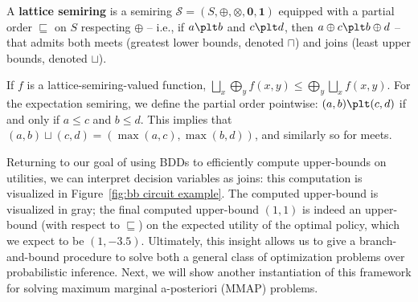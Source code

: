 \begin{definition}\label{def:latticed semiring}
  A \textbf{lattice semiring} is a semiring $\mathcal S = (S, \oplus, \otimes,
  \mathbf{0}, \mathbf{1})$ equipped with a partial order $\sqsubseteq$ on
  $S$ respecting $\oplus$ -- i.e., if $a \plt b$ and $c \plt d$, then
  $a \oplus c \plt b \oplus d$ -- that admits both meets (greatest lower bounds,
  denoted $\sqcap$) and joins (least upper bounds, denoted $\sqcup$).
\end{definition}

If $f$ is a lattice-semiring-valued function, $\bigsqcup_x \bigoplus_y
 f(x,y) \le  \bigoplus_y \bigsqcup_x f(x,y)$.  For the expectation
semiring, we define the partial order pointwise: $(a, b) \plt (c, d)$ if and
only if $a \le c$ and $b \le d$. This implies that $(a, b) \sqcup (c, d) =
(\max(a, c), \max(b, d))$, and similarly so for meets.

Returning to our goal of using BDDs to efficiently compute upper-bounds on
utilities, we can interpret decision variables as joins: this computation is visualized in
Figure~\ref{fig:bb circuit example}. The computed upper-bound is visualized in gray;
the final computed upper-bound $(1,1)$ is indeed an upper-bound
(with respect to $\sqsubseteq$)
on the expected
utility of the optimal policy, which we expect to be $(1, -3.5)$.
Ultimately, this insight allows us to give a branch-and-bound procedure
to solve both a general class of optimization problems over probabilistic
inference. Next, we will show another instantiation of this framework
for solving maximum marginal a-posteriori (MMAP) problems.




